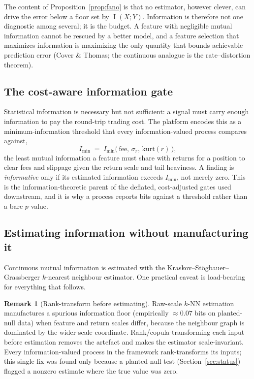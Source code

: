 \documentclass[11pt,a4paper]{article}
\theoremstyle{definition}
\newtheorem{remark}{Remark}[section]
\theoremstyle{plain}
\DeclareMathOperator{\MI}{I}
\begin{document}
The content of Proposition~\ref{prop:fano} is that no estimator, however clever, can drive the error
below a floor set by $\MI(X;Y)$. Information is therefore not one diagnostic among several; it is the
budget. A feature with negligible mutual information cannot be rescued by a better model, and a
feature selection that maximizes information is maximizing the only quantity that bounds achievable
prediction error (Cover \& Thomas; the continuous analogue is the rate--distortion theorem).

\subsection{The cost-aware information gate}

Statistical information is necessary but not sufficient: a signal must carry enough information to
pay the round-trip trading cost. The platform encodes this as a minimum-information threshold that
every information-valued process compares against,
\[
   I_{\min} \;=\; I_{\min}\!\big(\,\text{fee},\, \sigma_r,\, \mathrm{kurt}(r)\,\big),
\]
the least mutual information a feature must share with returns for a position to clear fees and
slippage given the return scale and tail heaviness. A finding is \emph{informative} only if its
estimated information exceeds $I_{\min}$, not merely zero. This is the information-theoretic parent
of the deflated, cost-adjusted gates used downstream, and it is why a process reports bits against a
threshold rather than a bare $p$-value.

\subsection{Estimating information without manufacturing it}

Continuous mutual information is estimated with the Kraskov--St\"ogbauer--Grassberger $k$-nearest
neighbour estimator. One practical caveat is load-bearing for everything that follows.

\begin{remark}[Rank-transform before estimating]
\label{rem:ksg}
Raw-scale $k$-NN estimation manufactures a spurious information floor (empirically $\approx 0.07$
bits on planted-null data) when feature and return scales differ, because the neighbour graph is
dominated by the wider-scale coordinate. Rank/copula-transforming each input before estimation
removes the artefact and makes the estimator scale-invariant. Every information-valued process in
the framework rank-transforms its inputs; this single fix was found only because a planted-null test
(Section~\ref{sec:status}) flagged a nonzero estimate where the true value was zero.
\end{remark}
\end{document}
